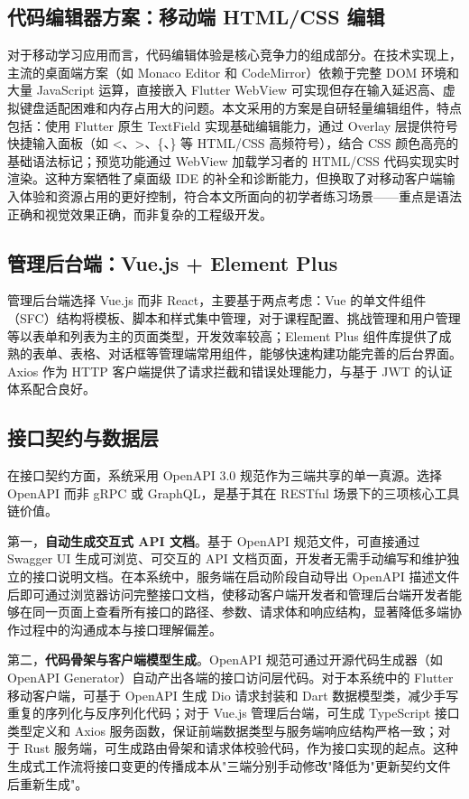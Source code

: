 \subsection{代码编辑器方案：移动端 HTML/CSS 编辑}

对于移动学习应用而言，代码编辑体验是核心竞争力的组成部分。在技术实现上，主流的桌面端方案（如 Monaco Editor 和 CodeMirror）依赖于完整 DOM 环境和大量 JavaScript 运算，直接嵌入 Flutter WebView 可实现但存在输入延迟高、虚拟键盘适配困难和内存占用大的问题。本文采用的方案是自研轻量编辑组件，特点包括：使用 Flutter 原生 TextField 实现基础编辑能力，通过 Overlay 层提供符号快捷输入面板（如 \textless、\textgreater、\{、\} 等 HTML/CSS 高频符号），结合 CSS 颜色高亮的基础语法标记；预览功能通过 WebView 加载学习者的 HTML/CSS 代码实现实时渲染。这种方案牺牲了桌面级 IDE 的补全和诊断能力，但换取了对移动客户端输入体验和资源占用的更好控制，符合本文所面向的初学者练习场景——重点是语法正确和视觉效果正确，而非复杂的工程级开发。

\subsection{管理后台端：Vue.js + Element Plus}

管理后台端选择 Vue.js 而非 React，主要基于两点考虑：Vue 的单文件组件（SFC）结构将模板、脚本和样式集中管理，对于课程配置、挑战管理和用户管理等以表单和列表为主的页面类型，开发效率较高；Element Plus 组件库提供了成熟的表单、表格、对话框等管理端常用组件，能够快速构建功能完善的后台界面。Axios 作为 HTTP 客户端提供了请求拦截和错误处理能力，与基于 JWT 的认证体系配合良好。

\subsection{接口契约与数据层}

在接口契约方面，系统采用 OpenAPI 3.0 规范作为三端共享的单一真源。选择 OpenAPI 而非 gRPC 或 GraphQL，是基于其在 RESTful 场景下的三项核心工具链价值。

第一，\textbf{自动生成交互式 API 文档}。基于 OpenAPI 规范文件，可直接通过 Swagger UI 生成可浏览、可交互的 API 文档页面，开发者无需手动编写和维护独立的接口说明文档。在本系统中，服务端在启动阶段自动导出 OpenAPI 描述文件后即可通过浏览器访问完整接口文档，使移动客户端开发者和管理后台端开发者能够在同一页面上查看所有接口的路径、参数、请求体和响应结构，显著降低多端协作过程中的沟通成本与接口理解偏差。

第二，\textbf{代码骨架与客户端模型生成}。OpenAPI 规范可通过开源代码生成器（如 OpenAPI Generator）自动产出各端的接口访问层代码。对于本系统中的 Flutter 移动客户端，可基于 OpenAPI 生成 Dio 请求封装和 Dart 数据模型类，减少手写重复的序列化与反序列化代码；对于 Vue.js 管理后台端，可生成 TypeScript 接口类型定义和 Axios 服务函数，保证前端数据类型与服务端响应结构严格一致；对于 Rust 服务端，可生成路由骨架和请求体校验代码，作为接口实现的起点。这种生成式工作流将接口变更的传播成本从"三端分别手动修改"降低为"更新契约文件后重新生成"。

